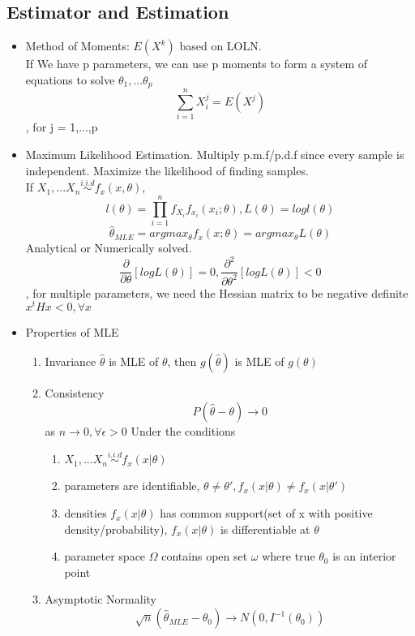 \documentclass[11pt, openany]{book}              %
\begin{document}
\subsection{Estimator and Estimation}

\begin{itemize}
    \item Method of Moments: $E(X^k)$ based on LOLN.\\ 
    	If We have p parameters, we can use p moments to form a system of equations to solve $\theta_1,...\theta_p$
    	$$\sum_{i=1}^n X_i^j= E(X^j)$$, for j = 1,...,p
    \item Maximum Likelihood Estimation. Multiply p.m.f/p.d.f since every sample is independent. Maximize the likelihood of finding samples. \\ If $X_1,...X_n \stackrel{i.i.d}{\sim} f_x(x, \theta)$, 
    	$$ l(\theta) =  \prod_{i=1}^n f_{X_i} f_{x_i} (x_i; \theta), L(\theta ) = log l(\theta)$$
    	$$ \hat{\theta}_{MLE}= argmax_{\theta} f_x(x;\theta ) = argmax_{\theta} L(\theta )$$
    	Analytical or Numerically solved. $$ \frac{\partial}{\partial \theta} [log L(\theta ) ] = 0, \frac{\partial^2}{\partial \theta^2} [log L(\theta ) ] < 0$$, for multiple parameters, we need the Hessian matrix to be negative definite $x^tHx<0, \forall x$ \\
    \item Properties of MLE
    	\begin{enumerate}
    		\item Invariance $\hat{\theta}$ is MLE of $\theta$, then $g(\hat{\theta})$ is MLE of $g(\theta)$
    		\item Consistency $$P(\hat{\theta} - \theta ) \rightarrow 0$$ as $n \rightarrow 0, \forall \epsilon > 0$ Under the conditions
    		\begin{enumerate}
    			\item $X_1,...X_n \stackrel{i.i.d}{\sim} f_x(x|\theta)$
    			\item parameters are identifiable, $\theta \neq \theta', f_x(x|\theta) \neq f_x(x|\theta')$
    			\item densities $f_x(x|\theta)$ has common support(set of x with positive density/probability), $f_x(x|\theta)$ is differentiable at $\theta$
    			\item parameter space $\Omega$ contains open set $\omega$ where true $\theta_0$ is an interior point
    		\end{enumerate}
    		\item Asymptotic Normality 
    		$$ \sqrt{n}(\hat{\theta}_{MLE} - \theta_0) \rightarrow N(0, I^{-1}(\theta_0)) $$

\end{enumerate}
\end{itemize}
\end{document}
